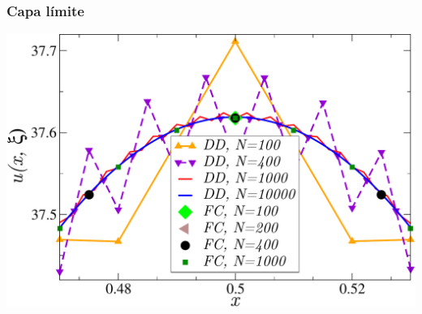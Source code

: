 \begin{frame}
\frametitle{Capa límite}
\centering
  \includegraphics[width=1.0\textwidth]{figuras/conv_2-eps-converted-to.pdf}\\


\end{frame}



